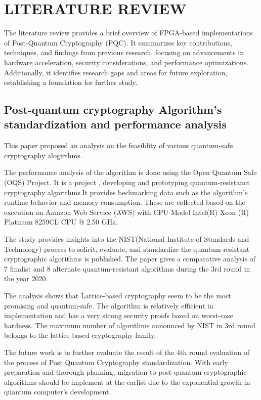 \chapter{LITERATURE REVIEW}

	The literature review provides a brief overview of FPGA-based implementations of Post-Quantum Cryptography (PQC). It summarizes key contributions, techniques, and findings from previous research, focusing on advancements in hardware acceleration, security considerations, and performance optimizations. Additionally, it identifies research gaps and areas for future exploration, establishing a foundation for further study.

\section{Post-quantum cryptography Algorithm's standardization and performance analysis \cite{paper_1}}

This paper proposed an analysis on the feasiblity of various quantum-safe cryptography alogirthms.

The performance analysis of the algorithm is done using the Open Quantum Safe (OQS) Project. It is a project , developing and prototyping quantum-resistanct cryptography algorithms.It provides bechmarking data such as the algorithm's runtime behavior and memory consumption. These are collected based on the execution on Amazon Web Service (AWS) with CPU Model Intel(R) Xeon (R) Platinum 8259CL CPU @ 2.50 GHz.

The study provides insights into the NIST(National Institute of Standards and Technology) process to solicit, evaluate, and standardize the quantum-resistant cryptographic algorithms is published. The paper gives a comparative analysis of 7 finalist and 8 alternate quantum-resistant algorithms during the 3rd round in the year 2020.

The analysis shows that Lattice-based cryptography seem to be the most promising and quantum-safe. The algorithm is relatively efficient in implementation and has a very strong security proofs based on worst-case hardness. The maximum number of algorithms announced by NIST in 3rd round belongs to the lattice-based cryptography family.

The future work is to further evaluate the result of the 4th round evaluation of the process of Post Quantum Cryptography standardization. With early preparation and thorough planning, migration to post-quantum cryptographic algorithms should be implement at the earlist due to the exponential growth in quantum computer's development.

